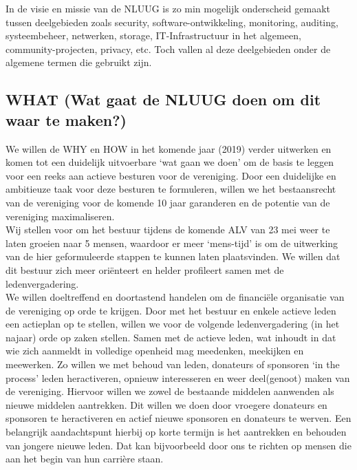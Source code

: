 \documentclass{article}
\begin{document}
In de visie en missie van de NLUUG is zo min mogelijk onderscheid gemaakt tussen deelgebieden zoals security, software-ontwikkeling, monitoring, auditing, systeembeheer, netwerken, storage, IT-Infrastructuur in het algemeen, community-projecten, privacy, etc. Toch vallen al deze deelgebieden onder de algemene termen die gebruikt zijn. \\

\subsection{WHAT (Wat gaat de NLUUG doen om dit waar te maken?)}
We willen de WHY en HOW in het komende jaar (2019) verder uitwerken en komen tot een duidelijk uitvoerbare `wat gaan we doen' om de basis te leggen voor een reeks aan actieve besturen voor de vereniging. Door een duidelijke en ambitieuze taak voor deze besturen te formuleren, willen we het bestaansrecht van de vereniging voor de komende 10 jaar garanderen en de potentie van de vereniging maximaliseren. \\

Wij stellen voor om het bestuur tijdens de komende ALV van 23 mei weer te laten groeien naar 5 mensen, waardoor er meer `mens-tijd' is om de uitwerking van de hier geformuleerde stappen te kunnen laten plaatsvinden. We willen dat dit bestuur zich meer ori\"enteert en helder profileert samen met de ledenvergadering. \\

We willen doeltreffend en doortastend handelen om de financi\"ele organisatie van de vereniging op orde te krijgen. Door met het bestuur en enkele actieve leden een actieplan op te stellen, willen we voor de volgende ledenvergadering (in het najaar) orde op zaken stellen. Samen met de actieve leden, wat inhoudt in dat wie zich aanmeldt in volledige openheid mag meedenken, meekijken en meewerken. Zo willen we met behoud van leden, donateurs of sponsoren `in the process' leden heractiveren, opnieuw interesseren en weer deel(genoot) maken van de vereniging. Hiervoor willen we zowel de bestaande middelen aanwenden als nieuwe middelen aantrekken. Dit willen we doen door vroegere donateurs en sponsoren te heractiveren en actief nieuwe sponsoren en donateurs te werven. Een belangrijk aandachtspunt hierbij op korte termijn is het aantrekken en behouden van jongere nieuwe leden. Dat kan bijvoorbeeld door ons te richten op mensen die aan het begin van hun carri\`ere staan. \\
\end{document}
